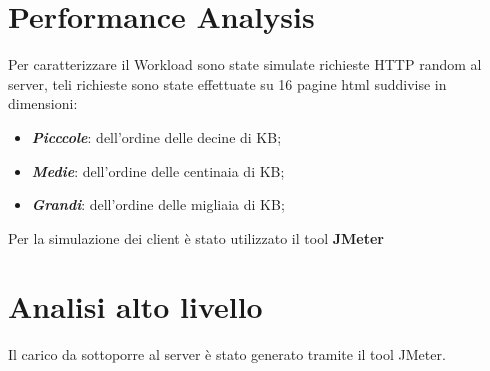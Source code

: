 \section{Performance Analysis}
Per caratterizzare il Workload sono state simulate richieste HTTP random al server,
teli richieste sono state effettuate su 16 pagine html suddivise in dimensioni:

\begin{itemize}
  \item \textbf{\textit{Picccole}}: dell'ordine delle decine di KB;
  \item \textbf{\textit{Medie}}: dell'ordine delle centinaia di KB;
  \item \textbf{\textit{Grandi}}: dell'ordine delle migliaia di KB;
\end{itemize}

Per la simulazione dei client è stato utilizzato il tool \textbf{JMeter}

\section{Analisi alto livello}

Il carico da sottoporre al server è stato generato tramite il tool JMeter.\\
